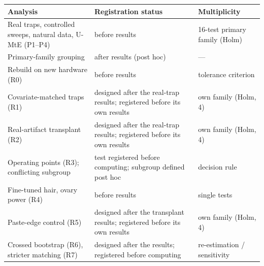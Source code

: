 \begin{center}\scriptsize\begin{tabular}{p{5.3cm}p{6cm}p{3.3cm}}\toprule
Analysis & Registration status & Multiplicity \\\midrule
Real traps, controlled sweeps, natural data, U-MtE (P1--P4) & before results & 16-test primary family (Holm) \\
Primary-family grouping & after results (post hoc) & --- \\
Rebuild on new hardware (R0) & before results & tolerance criterion \\
Covariate-matched traps (R1) & designed after the real-trap results; registered before its own results & own family (Holm, 4) \\
Real-artifact transplant (R2) & designed after the real-trap results; registered before its own results & own family (Holm, 4) \\
Operating points (R3); conflicting subgroup & test registered before computing; subgroup defined post hoc & decision rule \\
Fine-tuned hair, ovary power (R4) & before results & single tests \\
Paste-edge control (R5) & designed after the transplant results; registered before its own results & own family (Holm, 4) \\
Crossed bootstrap (R6), stricter matching (R7) & designed after the results; registered before computing & re-estimation / sensitivity \\
\bottomrule\end{tabular}\end{center}

